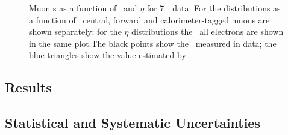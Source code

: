 \begin{figure}[h]
\centering
\vspace{-8mm}
    \caption[Muon \FakeFactor s as a function of \pt\ and $\eta$ for 7~\tev\ data.]
    {Muon \FakeFactor s as a function of \pt\ and $\eta$ for 7~\tev\ data. 
    For the distributions as a function of \pt\, central, forward and calorimeter-tagged muons are shown
    separately; for the $\eta$ distributions the \ffactor\ all electrons are
    shown in the same plot.The black points show the \ffactor\ measured in
    data; the blue triangles show the value estimated by \mc.}
\label{fig:ff-mu-seven} 
\end{figure}

\subsection{Results}
\subsection{Statistical and Systematic Uncertainties}
